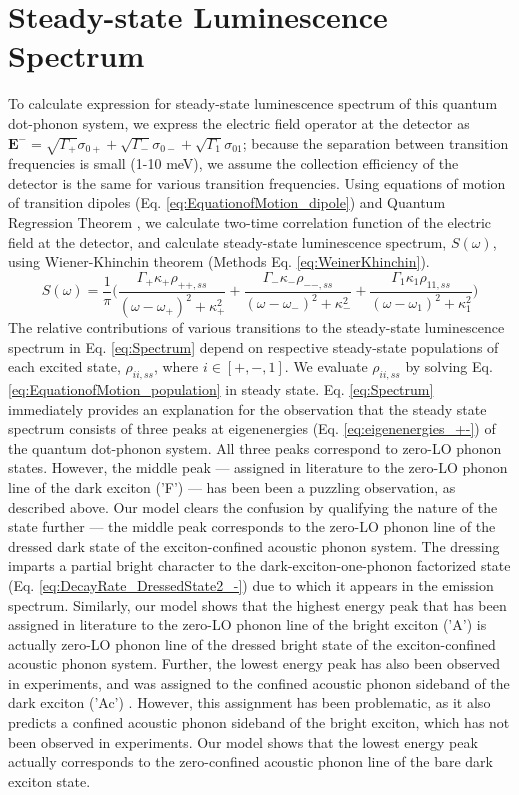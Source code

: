 \documentclass[aps,pra,preprint,groupedaddress]{revtex4-1}
\begin{document}
\section*{Steady-state Luminescence Spectrum}
To calculate expression for steady-state luminescence spectrum of this quantum dot-phonon system, we express the electric field operator at the detector \cite{Madsen2013} as $\mathbf{E^-}=\sqrt{\Gamma_+}\sigma_{0+} + \sqrt{\Gamma_-}\sigma_{0-} + \sqrt{\Gamma_1}\sigma_{01}$; because the separation between transition frequencies is small (1-10 meV), we assume the collection efficiency of the detector is the same for various transition frequencies. Using equations of motion of transition dipoles (Eq. \ref{eq:EquationofMotion_dipole}) and Quantum Regression Theorem \cite{Scully1997}, we calculate two-time correlation function of the electric field at the detector, and calculate steady-state luminescence spectrum, $S(\omega)$, using Wiener-Khinchin theorem \cite{Scully1997}  (Methods Eq. \ref{eq:WeinerKhinchin}). 
\begin{equation}
\label{eq:Spectrum}
S(\omega)=\frac{1}{\pi}\bigg(\frac{\Gamma_+\kappa_+\rho_{++,ss}}{(\omega-\omega_+)^2+\kappa_+^2} + \frac{\Gamma_-\kappa_-\rho_{--,ss}}{(\omega-\omega_-)^2+\kappa_-^2} + \frac{\Gamma_1\kappa_1\rho_{11,ss}}{(\omega-\omega_1)^2+\kappa_1^2}\bigg)
\end{equation}
The relative contributions of various transitions to the steady-state luminescence spectrum in Eq. \ref{eq:Spectrum} depend on respective steady-state populations of each excited state, $\rho_{ii,ss}$, where $i\in[+,-,1]$. We evaluate $\rho_{ii,ss}$ by solving Eq. \ref{eq:EquationofMotion_population} in steady state. Eq. \ref{eq:Spectrum} immediately provides an explanation for the observation \cite{Biadala2009} that the steady state spectrum consists of three peaks at eigenenergies (Eq. \ref{eq:eigenenergies_+-}) of the quantum dot-phonon system. All three peaks correspond to zero-LO phonon states. However, the middle peak --- assigned in literature to the zero-LO phonon line of the dark exciton ('F') \cite{Biadala2009} --- has been been a puzzling observation, as described above. Our model clears the confusion by qualifying the nature of the state further --- the middle peak corresponds to the zero-LO phonon line of the dressed dark state of the exciton-confined acoustic phonon system. The dressing imparts a partial bright character to the dark-exciton-one-phonon factorized state (Eq. \ref{eq:DecayRate_DressedState2_-}) due to which it appears in the emission spectrum. Similarly, our model shows that the highest energy peak that has been assigned in literature to the zero-LO phonon line of the bright exciton ('A') \cite{Biadala2009} is actually zero-LO phonon line of the dressed bright state of the exciton-confined acoustic phonon system. Further, the lowest energy peak has also been observed in experiments, and was assigned to the confined acoustic phonon sideband of the dark exciton ('Ac') \cite{Biadala2009}. However, this assignment has been problematic, as it also predicts a confined acoustic phonon sideband of the bright exciton, which has not been observed in experiments. Our model shows that the lowest energy peak actually corresponds to the zero-confined acoustic phonon line of the bare dark exciton state. 
\end{document}
